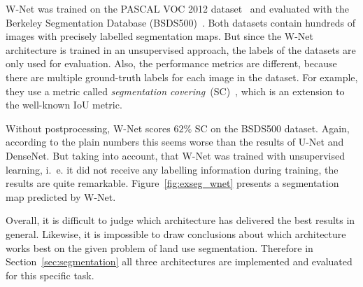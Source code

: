 W-Net was trained on the PASCAL VOC 2012 dataset~\cite{pascal_voc10} and evaluated with the Berkeley Segmentation Database (BSDS500)~\cite{hierarchy_imgseg11}. Both datasets contain hundreds of images with precisely labelled segmentation maps. But since the W-Net architecture is trained in an unsupervised approach, the labels of the datasets are only used for evaluation. Also, the performance metrics are different, because there are multiple ground-truth labels for each image in the dataset. For example, they use a metric called \emph{segmentation covering}~(SC)~\cite{hierarchy_imgseg11}, which is an extension to the well-known IoU metric.

Without postprocessing, W-Net scores $62\%$ SC on the BSDS500 dataset. Again, according to the plain numbers this seems worse than the results of U-Net and DenseNet. But taking into account, that W-Net was trained with unsupervised learning, i.~e. it did not receive any labelling information during training, the results are quite remarkable. Figure~\ref{fig:exseg_wnet} presents a segmentation map predicted by W-Net.

Overall, it is difficult to judge which architecture has delivered the best results in general. Likewise, it is impossible to draw conclusions about which architecture works best on the given problem of land use segmentation. Therefore in Section~\ref{sec:segmentation} all three architectures are implemented and evaluated for this specific task.

\clearpage